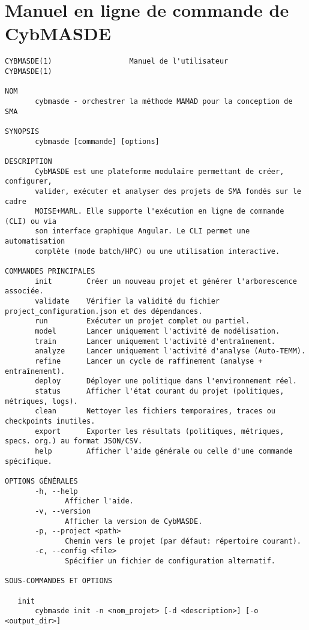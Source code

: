 \chapter{Manuel en ligne de commande de CybMASDE}\label{appendix:cybmasde-manual}

\begin{verbatim}
CYBMASDE(1)                  Manuel de l'utilisateur                  CYBMASDE(1)

NOM
       cybmasde - orchestrer la méthode MAMAD pour la conception de SMA

SYNOPSIS
       cybmasde [commande] [options]

DESCRIPTION
       CybMASDE est une plateforme modulaire permettant de créer, configurer,
       valider, exécuter et analyser des projets de SMA fondés sur le cadre
       MOISE+MARL. Elle supporte l'exécution en ligne de commande (CLI) ou via
       son interface graphique Angular. Le CLI permet une automatisation
       complète (mode batch/HPC) ou une utilisation interactive.

COMMANDES PRINCIPALES
       init        Créer un nouveau projet et générer l'arborescence associée.
       validate    Vérifier la validité du fichier project_configuration.json et des dépendances.
       run         Exécuter un projet complet ou partiel.
       model       Lancer uniquement l'activité de modélisation.
       train       Lancer uniquement l'activité d'entraînement.
       analyze     Lancer uniquement l'activité d'analyse (Auto-TEMM).
       refine      Lancer un cycle de raffinement (analyse + entraînement).
       deploy      Déployer une politique dans l'environnement réel.
       status      Afficher l'état courant du projet (politiques, métriques, logs).
       clean       Nettoyer les fichiers temporaires, traces ou checkpoints inutiles.
       export      Exporter les résultats (politiques, métriques, specs. org.) au format JSON/CSV.
       help        Afficher l'aide générale ou celle d'une commande spécifique.

OPTIONS GÉNÉRALES
       -h, --help
              Afficher l'aide.
       -v, --version
              Afficher la version de CybMASDE.
       -p, --project <path>
              Chemin vers le projet (par défaut: répertoire courant).
       -c, --config <file>
              Spécifier un fichier de configuration alternatif.

SOUS-COMMANDES ET OPTIONS

   init
       cybmasde init -n <nom_projet> [-d <description>] [-o <output_dir>]


\end{verbatim}
